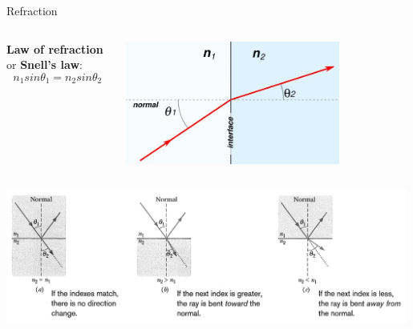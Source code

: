 \begin{frame}{Refraction}

\begin{columns}
  \begin{column}{0.66\textwidth}
   \begin{center}
      {\bf Law of refraction} or {\bf Snell's law}:
     \begin{equation*}
          n_1 sin\theta_1 = n_2 sin\theta_2
      \end{equation*}
   \end{center}
  \end{column}
  \begin{column}{0.34\textwidth}
    \begin{center}
      \includegraphics[width=0.75\textwidth]{./images/schematics/snells_law}\\
    \end{center}
  \end{column}
\end{columns}

\vspace{0.2cm}

\begin{center}
    \includegraphics[width=0.99\textwidth]{./images/schematics/refraction_direction}\\
\end{center}

\end{frame}

%
%
%

